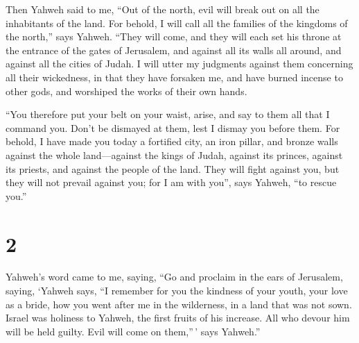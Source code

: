 Then Yahweh said to me, ``Out of the north, evil will
break out on all the inhabitants of the land.  For behold,
I will call all the families of the kingdoms of the north,'' says
Yahweh. ``They will come, and they will each set his throne at the
entrance of the gates of Jerusalem, and against all its walls all
around, and against all the cities of Judah.  I will utter
my judgments against them concerning all their wickedness, in that they
have forsaken me, and have burned incense to other gods, and worshiped
the works of their own hands.

 ``You therefore put your belt on your waist, arise, and
say to them all that I command you. Don't be dismayed at them, lest I
dismay you before them.  For behold, I have made you today
a fortified city, an iron pillar, and bronze walls against the whole
land---against the kings of Judah, against its princes, against its
priests, and against the people of the land.  They will
fight against you, but they will not prevail against you; for I am with
you'', says Yahweh, ``to rescue you.''

\hypertarget{section-1}{%
\section{2}\label{section-1}}

 Yahweh's word came to me, saying,  ``Go and
proclaim in the ears of Jerusalem, saying, `Yahweh says, ``I remember
for you the kindness of your youth, your love as a bride, how you went
after me in the wilderness, in a land that was not sown. 
Israel was holiness to Yahweh, the first fruits of his increase. All who
devour him will be held guilty. Evil will come on them,''\,' says
Yahweh.''

